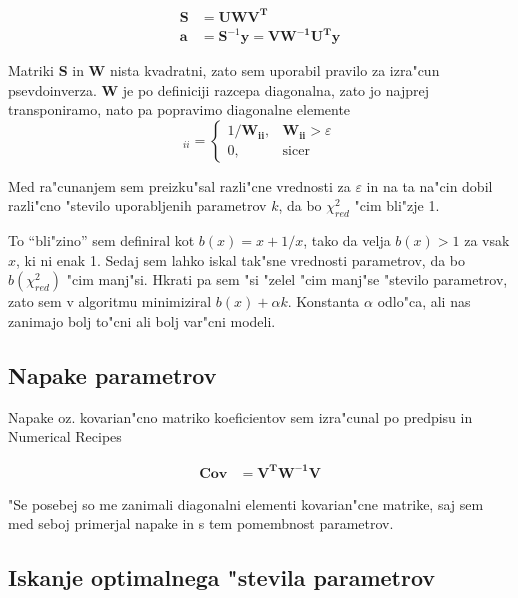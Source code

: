 \documentclass[a4paper,10pt]{article}
\begin{document}
\begin{align}
 \mathbf{S} &= \mathbf{U W V^T} \\
 \mathbf{a} &= \mathbf{S}^{-1}\mathbf{y} = \mathbf{V W^{-1} U^T y}
\end{align}

Matriki $\mathbf{S}$ in $\mathbf{W}$ nista kvadratni, zato sem uporabil pravilo za izra"cun psevdoinverza. $\mathbf{W}$ je po definiciji razcepa diagonalna, zato jo najprej transponiramo, nato pa popravimo diagonalne elemente
\begin{equation}
 [\mathbf W^{-1}]_{ii} = \left\{ \begin{matrix}
                         1/\mathbf{W_{ii}}, & \mathbf{W_{ii}} > \varepsilon \\
			 0, & \mathrm{sicer}
                        \end{matrix} \right.
\end{equation}

Med ra"cunanjem sem preizku"sal razli"cne vrednosti za $\varepsilon$ in na ta na"cin dobil razli"cno "stevilo uporabljenih parametrov $k$, da bo $\chi^2_{red}$ "cim bli"zje 1. 

To ``bli"zino'' sem definiral kot $b(x) = x + 1/x$, tako da velja $b(x) > 1$ za vsak $x$, ki ni enak 1. Sedaj sem lahko iskal tak"sne vrednosti parametrov, da bo $b(\chi^2_{red})$ "cim manj"si. Hkrati pa sem "si "zelel "cim manj"se "stevilo parametrov, 
zato sem v algoritmu minimiziral $b(x) + \alpha k$. Konstanta $\alpha$ odlo"ca, ali nas zanimajo bolj to"cni ali bolj var"cni modeli. 

\subsection{Napake parametrov}

Napake oz. kovarian"cno matriko koeficientov sem izra"cunal po predpisu in Numerical Recipes

\begin{align}
 \mathbf{Cov} &= \mathbf{V^T W^{-1} V}
\end{align}

"Se posebej so me zanimali diagonalni elementi kovarian"cne matrike, saj sem med seboj primerjal napake in s tem pomembnost parametrov. 

\subsection{Iskanje optimalnega "stevila parametrov}
\end{document}
